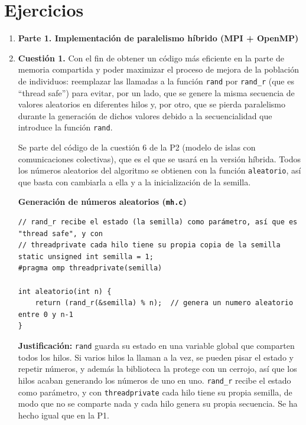 \documentclass[12pt]{article}
\begin{document}
\newpage

\section{Ejercicios}

\begin{enumerate}

\item[] \textbf{\large Parte 1. Implementación de paralelismo híbrido (MPI + OpenMP)}

\item \textbf{Cuestión 1.} Con el fin de obtener un código más eficiente en la parte de memoria compartida y poder maximizar el proceso de mejora de la población de individuos: reemplazar las llamadas a la función \texttt{rand} por \texttt{rand\_r} (que es ``thread safe'') para evitar, por un lado, que se genere la misma secuencia de valores aleatorios en diferentes hilos y, por otro, que se pierda paralelismo durante la generación de dichos valores debido a la secuencialidad que introduce la función \texttt{rand}.


Se parte del código de la cuestión 6 de la P2 (modelo de islas con comunicaciones colectivas), que es el que se usará en la versión híbrida. Todos los números aleatorios del algoritmo se obtienen con la función \texttt{aleatorio}, así que basta con cambiarla a ella y a la inicialización de la semilla.

\medskip
\noindent\textbf{Generación de números aleatorios (\texttt{mh.c})}\par
\smallskip

\begin{lstlisting}[style=EstiloC]
// rand_r recibe el estado (la semilla) como parámetro, así que es "thread safe", y con
// threadprivate cada hilo tiene su propia copia de la semilla
static unsigned int semilla = 1;
#pragma omp threadprivate(semilla)

int aleatorio(int n) {
	return (rand_r(&semilla) % n);  // genera un numero aleatorio entre 0 y n-1
}
\end{lstlisting}

\textbf{Justificación:} \texttt{rand} guarda su estado en una variable global que comparten todos los hilos. Si varios hilos la llaman a la vez, se pueden pisar el estado y repetir números, y además la biblioteca la protege con un cerrojo, así que los hilos acaban generando los números de uno en uno. \texttt{rand\_r} recibe el estado como parámetro, y con \texttt{threadprivate} cada hilo tiene su propia semilla, de modo que no se comparte nada y cada hilo genera su propia secuencia. Se ha hecho igual que en la P1.


\end{enumerate}
\end{document}
